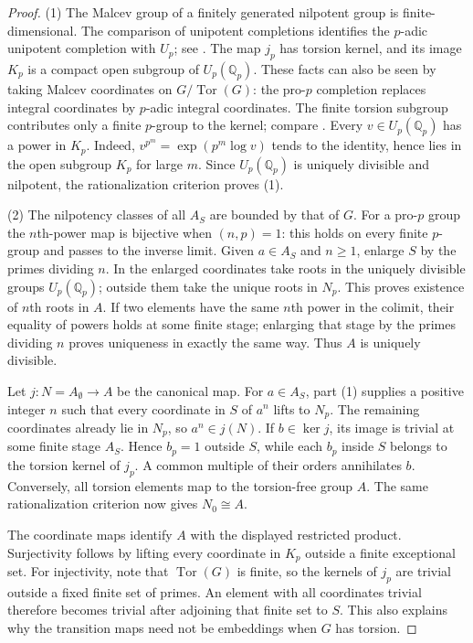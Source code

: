 \documentclass[11pt,a4paper]{article}
\begin{document}
\begin{proof}
(1) The Malcev group of a finitely generated nilpotent group is
finite-dimensional.  The comparison of unipotent completions identifies
the $p$-adic unipotent completion with $U_p$; see
\cite[Appendix~A, Theorem~A.6 and Lemma~A.7]{HM2003}.
The map $j_p$ has torsion kernel, and its image $K_p$ is a compact open
subgroup of $U_p(\mathbb Q_p)$.  These facts can also be seen by taking
Malcev coordinates on $G/\operatorname{Tor}(G)$: the pro-$p$ completion
replaces integral coordinates by $p$-adic integral coordinates.  The
finite torsion subgroup contributes only a finite $p$-group to the
kernel; compare \cite[Appendix~A, Theorem~A.3 and Lemma~A.5]{HM2003}.
Every $v\in U_p(\mathbb Q_p)$ has a power in $K_p$.  Indeed,
$v^{p^m}=\exp(p^m\log v)$ tends to the identity, hence lies in the open
subgroup $K_p$ for large $m$.  Since $U_p(\mathbb Q_p)$ is uniquely
divisible and nilpotent, the rationalization criterion
\cite[Appendix~A, Corollary~3.8]{Qui5} proves (1).

(2) The nilpotency classes of all $A_S$ are bounded by that of $G$.
For a pro-$p$ group the $n$th-power map is bijective when $(n,p)=1$:
this holds on every finite $p$-group and passes to the inverse limit.
Given $a\in A_S$ and $n\geq1$, enlarge $S$ by the primes dividing $n$.
In the enlarged coordinates take roots in the uniquely divisible groups
$U_p(\mathbb Q_p)$; outside them take the unique roots in $N_p$.
This proves existence of $n$th roots in $A$.  If two elements have the
same $n$th power in the colimit, their equality of powers holds at some
finite stage; enlarging that stage by the primes dividing $n$ proves
uniqueness in exactly the same way.  Thus $A$ is uniquely divisible.

Let $j:N=A_{\emptyset}\to A$ be the canonical map.  For $a\in A_S$,
part (1) supplies a positive integer $n$ such that every coordinate in
$S$ of $a^n$ lifts to $N_p$.  The remaining coordinates already lie in
$N_p$, so $a^n\in j(N)$.  If $b\in\ker j$, its image is trivial at
some finite stage $A_S$.  Hence $b_p=1$ outside $S$, while each $b_p$
inside $S$ belongs to the torsion kernel of $j_p$.  A common multiple
of their orders annihilates $b$.  Conversely, all torsion elements map
to the torsion-free group $A$.  The same rationalization criterion now
gives $N_0\cong A$.

The coordinate maps identify $A$ with the displayed restricted product.
Surjectivity follows by lifting every coordinate in $K_p$ outside a
finite exceptional set.  For injectivity, note that
$\operatorname{Tor}(G)$ is finite, so the kernels of $j_p$ are trivial
outside a fixed finite set of primes.  An element with all coordinates
trivial therefore becomes trivial after adjoining that finite set to
$S$.  This also explains why the transition maps need not be embeddings
when $G$ has torsion.


\end{proof}
\end{document}
